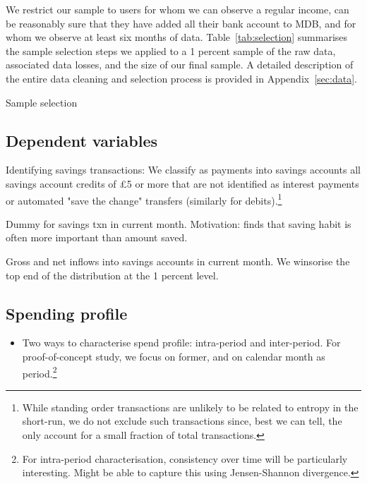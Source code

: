 We restrict our sample to users for whom we can observe a regular income, can
be reasonably sure that they have added all their bank account to MDB, and for
whom we observe at least six months of data. Table~\ref{tab:selection}
summarises the sample selection steps we applied to a 1 percent sample of the
raw data, associated data losses, and the size of our final sample. A detailed
description of the entire data cleaning and selection process is provided in
Appendix~\ref{sec:data}.

\begin{table}[H]
\caption{Sample selection}\label{tab:selection}

\end{table}



\subsection{Dependent variables}
\label{par:outcome_variable_}

Identifying savings transactions: We classify as payments into savings accounts
all savings account credits of \pounds5 or more that are not identified as
interest payments or automated "save the change" transfers (similarly for
debits).\footnote{While standing order transactions are unlikely to be related
to entropy in the short-run, we do not exclude such transactions since, best we
can tell, the only account for a small fraction of total transactions.} 

Dummy for savings txn in current month. Motivation: \citet{mps2018building} finds that
saving habit is often more important than amount saved.

Gross and net inflows into savings accounts in current month. We winsorise the
top end of the distribution at the 1 percent level.




\subsection{Spending profile}%
\label{par:variable_of_interest_}

\begin{itemize}
    \item Two ways to characterise spend profile: intra-period and
        inter-period. For proof-of-concept study, we focus on former, and on
        calendar month as period.\footnote{For intra-period characterisation,
        consistency over time will be particularly interesting. Might be able
    to capture this using Jensen-Shannon divergence.}
\end{itemize}


